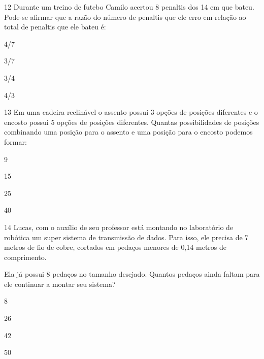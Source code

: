 \num{12} Durante um treino de futebo Camilo acertou 8 penaltis dos 14 em
que bateu. Pode-se afirmar que a razão do número de penaltis que ele
erro em relação ao total de penaltis que ele bateu é:

\begin{escolha}
\item
  4/7
\item
  3/7
\item
  3/4
\item
  4/3
\end{escolha}


\num{13} Em uma cadeira reclinável o assento possui 3 opções de posições
diferentes e o encosto possui 5 opções de posições diferentes. Quantas
possibilidades de posições combinando uma posição para o assento e uma
posição para o encosto podemos formar:

\begin{escolha}
\item
  9
\item
  15
\item
  25
\item
  40
\end{escolha}


\num{14} Lucas, com o auxílio de seu professor está montando no laboratório
de robótica um super sistema de transmissão de dados. Para isso, ele
precisa de 7 metros de fio de cobre, cortados em pedaços menores de 0,14
metros de comprimento.

Ela já possui 8 pedaços no tamanho desejado. Quantos pedaços ainda
faltam para ele continuar a montar seu sistema?

\begin{escolha}
\item
  8
\item
  26
\item
  42
\item
  50
\end{escolha}

